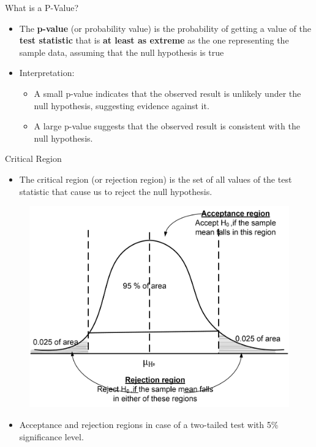 \documentclass[
  ignorenonframetext,
]{beamer}
\providecommand{\tightlist}{%
  \setlength{\itemsep}{0pt}\setlength{\parskip}{0pt}}
\begin{document}
\begin{frame}{What is a P-Value?}
\label{what-is-a-p-value}
\begin{itemize}
\tightlist
\item
  The \textbf{p-value} (or probability value) is the probability of
  getting a value of the \textbf{test statistic} that is \textbf{at
  least as extreme} as the one representing the sample data, assuming
  that the null hypothesis is true
\end{itemize}

\begin{itemize}
\item
  Interpretation:

  \begin{itemize}
  \tightlist
  \item
    A small p-value indicates that the observed result is unlikely under
    the null hypothesis, suggesting evidence against it.\\
  \item
    A large p-value suggests that the observed result is consistent with
    the null hypothesis.
  \end{itemize}
\end{itemize}
\end{frame}

\begin{frame}{Critical Region}
\label{critical-region}
\begin{itemize}
\tightlist
\item
  The critical region (or rejection region) is the set of all values of
  the test statistic that cause us to reject the null hypothesis.
\end{itemize}

\begin{figure}

{\centering \includegraphics[width=0.4\linewidth]{figs/criticalregion} 

}

\end{figure}

\begin{itemize}
\tightlist
\item
  Acceptance and rejection regions in case of a two-tailed test with 5\%
  significance level.
\end{itemize}
\end{frame}
\end{document}
